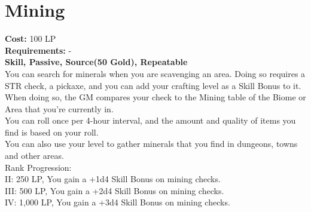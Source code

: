\section{Mining}\label{perk:mining}
\textbf{Cost:} 100 LP\\
\textbf{Requirements:} -\\
\textbf{Skill, Passive, Source(50 Gold), Repeatable}\\
You can search for minerals when you are scavenging an area.
Doing so requires a STR check, a pickaxe, and you can add your crafting level as a Skill Bonus to it.
When doing so, the GM compares your check to the Mining table of the Biome or Area that you're currently in.\\
You can roll once per 4-hour interval, and the amount and quality of items you find is based on your roll.\\
You can also use your level to gather minerals that you find in dungeons, towns and other areas.
\\
Rank Progression:\\
II: 250 LP, You gain a +1d4 Skill Bonus on mining checks.\\
III: 500 LP, You gain a +2d4 Skill Bonus on mining checks.\\
IV: 1,000 LP, You gain a +3d4 Skill Bonus on mining checks.\\